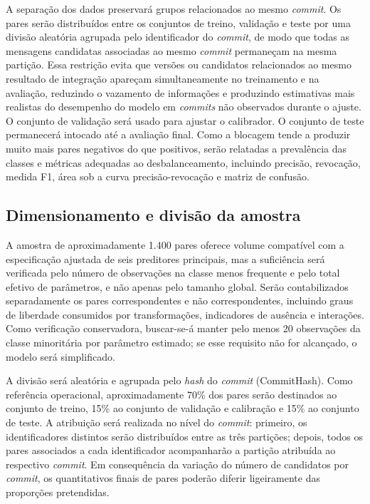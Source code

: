 A separação dos dados preservará grupos relacionados ao mesmo \textit{commit}. Os pares serão distribuídos entre os conjuntos de treino, validação e teste por uma divisão aleatória agrupada pelo identificador do \textit{commit}, de modo que todas as mensagens candidatas associadas ao mesmo \textit{commit} permaneçam na mesma partição. Essa restrição evita que versões ou candidatos relacionados ao mesmo resultado de integração apareçam simultaneamente no treinamento e na avaliação, reduzindo o vazamento de informações e produzindo estimativas mais realistas do desempenho do modelo em \textit{commits} não observados durante o ajuste. O conjunto de validação será usado para ajustar o calibrador. O conjunto de teste permanecerá intocado até a avaliação final. Como a blocagem tende a produzir muito mais pares negativos do que positivos, serão relatadas a prevalência das classes e métricas adequadas ao desbalanceamento, incluindo precisão, revocação, medida F1, área sob a curva precisão-revocação e matriz de confusão.

\subsection{Dimensionamento e divisão da amostra}

A amostra de aproximadamente 1.400 pares oferece volume compatível com a especificação ajustada de seis preditores principais, mas a suficiência será verificada pelo número de observações na classe menos frequente e pelo total efetivo de parâmetros, e não apenas pelo tamanho global. Serão contabilizados separadamente os pares correspondentes e não correspondentes, incluindo graus de liberdade consumidos por transformações, indicadores de ausência e interações. Como verificação conservadora, buscar-se-á manter pelo menos 20 observações da classe minoritária por parâmetro estimado; se esse requisito não for alcançado, o modelo será simplificado. 

A divisão será aleatória e agrupada pelo \textit{hash} do \textit{commit} (CommitHash). Como referência operacional, aproximadamente 70\% dos pares serão destinados ao conjunto de treino, 15\% ao conjunto de validação e calibração e 15\% ao conjunto de teste. A atribuição será realizada no nível do \textit{commit}: primeiro, os identificadores distintos serão distribuídos entre as três partições; depois, todos os pares associados a cada identificador acompanharão a partição atribuída ao respectivo \textit{commit}. Em consequência da variação do número de candidatos por \textit{commit}, os quantitativos finais de pares poderão diferir ligeiramente das proporções pretendidas.

